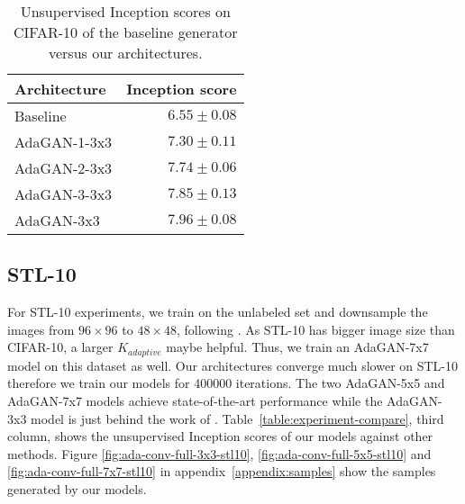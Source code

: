 \documentclass{article} %
\begin{document}
\begin{table}[t]
\caption{Unsupervised Inception scores on CIFAR-10 of the baseline generator versus our architectures.}
\label{table:cifar10-experiment-improve}
\begin{center}
\begin{tabular}{l|r}
Architecture     & Inception score          \\ \hline \hline
Baseline         & $6.55 \pm 0.08$          \\ \hline
AdaGAN-1-3x3     & $7.30 \pm 0.11$          \\
AdaGAN-2-3x3     & $7.74 \pm 0.06$          \\
AdaGAN-3-3x3     & $7.85 \pm 0.13$          \\
AdaGAN-3x3       & $\mathbf{7.96 \pm 0.08}$
\end{tabular}
\end{center}
\end{table}

\subsection{STL-10}
For STL-10 experiments, we train on the unlabeled set and downsample the images from $96 \times 96$ to $48 \times 48$, following \cite{warde2016improving}. As STL-10 has bigger image size than CIFAR-10, a larger $K_{adaptive}$ maybe helpful. Thus, we train an AdaGAN-7x7 model on this dataset as well. Our architectures converge much slower on STL-10 therefore we train our models for 400000 iterations. The two AdaGAN-5x5 and AdaGAN-7x7 models achieve state-of-the-art performance while the AdaGAN-3x3 model is just behind the work of \cite{1709.07359}. Table~\ref{table:experiment-compare}, third column, shows the unsupervised Inception scores of our models against other methods. Figure \ref{fig:ada-conv-full-3x3-stl10}, \ref{fig:ada-conv-full-5x5-stl10} and \ref{fig:ada-conv-full-7x7-stl10} in appendix~\ref{appendix:samples} show the samples generated by our models.
\end{document}
